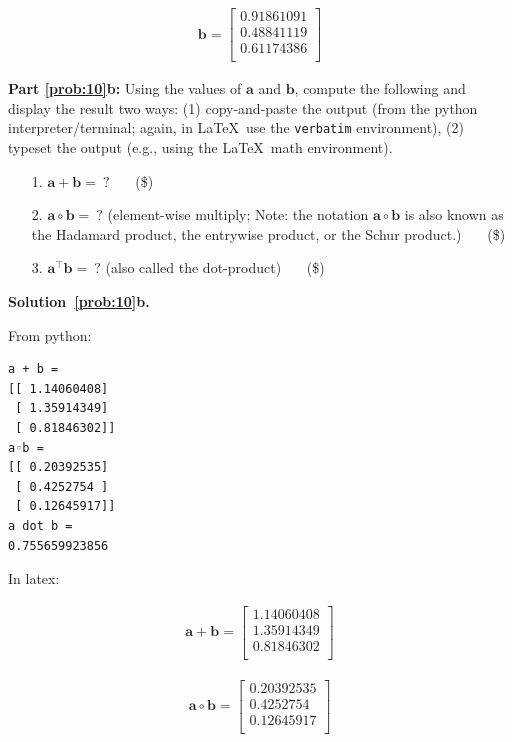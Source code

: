 \documentclass[10pt]{article}
\begin{document}
\begin{enumerate}
\begin{eqnarray*}
\mathbf{b} =
    \begin{bmatrix}
    0.91861091 \\[0.3em]
    0.48841119 \\[0.3em]
    0.61174386 \\[0.3em]
    \end{bmatrix}
\end{eqnarray*}



{\bf Part \ref{prob:10}b:} Using the values of $\mathbf{a}$ and $\mathbf{b}$, compute the following and display the result two ways: (1) copy-and-paste the output (from the python interpreter/terminal; again, in \LaTeX~use the {\tt verbatim} environment), (2) typeset the output (e.g., using the \LaTeX~math environment).
\begin{enumerate}
\item[1.] $\mathbf{a} + \mathbf{b} = ~?$ ~~~(\$)
\item[2.] $\mathbf{a} \circ \mathbf{b} = ~?$  (element-wise multiply; Note: the notation $\mathbf{a} \circ \mathbf{b}$ is also known as the Hadamard product, the entrywise product, or the Schur product.) ~~~(\$)
\item[3.] $\mathbf{a}^\top \mathbf{b} = ~?$  (also called the dot-product) ~~~(\$)
\end{enumerate}

{\bf Solution~\ref{prob:10}b.} 

From python:

\begin{verbatim}
a + b = 
[[ 1.14060408]
 [ 1.35914349]
 [ 0.81846302]]
a◦b =
[[ 0.20392535]
 [ 0.4252754 ]
 [ 0.12645917]]
a dot b =
0.755659923856
\end{verbatim}

In latex:

\begin{eqnarray*}
\mathbf{a} + \mathbf{b} =
    \begin{bmatrix}
    1.14060408 \\[0.3em]
    1.35914349 \\[0.3em]
    0.81846302 \\[0.3em]
    \end{bmatrix}
\end{eqnarray*}

\begin{eqnarray*}
\mathbf{a} \circ \mathbf{b} =
    \begin{bmatrix}
    0.20392535 \\[0.3em]
    0.4252754 \\[0.3em]
    0.12645917 \\[0.3em]
    \end{bmatrix}
\end{eqnarray*}


\end{enumerate}
\end{document}
